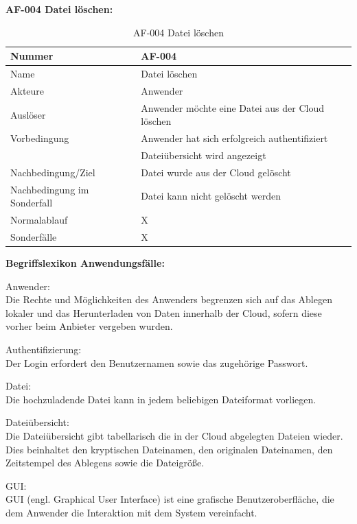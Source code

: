 \documentclass[12pt,a4paper,bibliography=totocnumbered,listof=totocnumbered]{scrartcl}
\begin{document}
\textbf{AF-004 Datei l\"oschen:}
\begin{table}[!h]
	\centering
	\begin{tabular}{|l|l|}
		\hline
		Nummer & AF-004\\
		\hline
		Name & Datei löschen\\
		\hline
		Akteure & Anwender\\
		\hline
		Auslöser & Anwender möchte eine Datei aus der Cloud löschen\\
		\hline
		Vorbedingung & Anwender hat sich erfolgreich authentifiziert \\ & Dateiübersicht wird angezeigt\\
		\hline
		Nachbedingung/Ziel & Datei wurde aus der Cloud gelöscht \\
		\hline
		Nachbedingung im Sonderfall & Datei kann nicht gelöscht werden \\
		\hline
		Normalablauf & X\\
		\hline
		Sonderfälle & X \\
		\hline
	\end{tabular}
	\caption{AF-004 Datei löschen}
	\label{tab:AF-004 Datei loeschen}
\end{table}
\pagebreak

\textbf{Begriffslexikon Anwendungsfälle:}
\begin{compactitem}
\item Anwender:\\
Die Rechte und Möglichkeiten des Anwenders begrenzen sich auf das Ablegen lokaler und das Herunterladen von Daten innerhalb der Cloud, sofern diese vorher beim Anbieter vergeben wurden.
\item Authentifizierung:\\
Der Login erfordert den Benutzernamen sowie das zugehörige Passwort.
\item Datei:\\
Die hochzuladende Datei kann in jedem beliebigen Dateiformat vorliegen.
\item Dateiübersicht:\\
Die Dateiübersicht gibt tabellarisch die in der Cloud abgelegten Dateien wieder. Dies beinhaltet den kryptischen Dateinamen, den originalen Dateinamen, den Zeitstempel des Ablegens sowie die Dateigröße.
\item GUI:\\
GUI (engl. Graphical User Interface) ist eine grafische Benutzeroberfläche, die dem Anwender die Interaktion mit dem System vereinfacht.
\end{compactitem}
\end{document}
